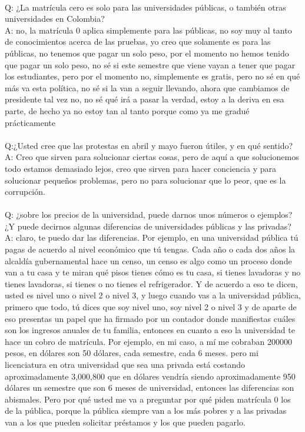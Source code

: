 \documentclass{phyasgn}\usepackage{nag}
\begin{document}
\\
Q: ¿La matrícula cero es solo para las universidades públicas, o también otras universidades en Colombia?\\
A: no, la matrícula 0 aplica simplemente para las públicas, no soy muy al tanto de conocimientos acerca de las pruebas, yo creo que solamente es para las públicas, no tenemos que pagar un solo peso, por el momento no hemos tenido que pagar un solo peso, no sé si este semestre que viene vayan a tener que pagar los estudiantes, pero por el momento no, simplemente es gratis, pero no sé en qué más va esta política, no sé si la van a seguir llevando, ahora que cambiamos de presidente tal vez no, no sé qué irá a pasar la verdad, estoy a la deriva en esa parte, de hecho ya no estoy tan al tanto porque como ya me gradué prácticamente\\
\\
Q:¿Usted cree que las protestas en abril y mayo fueron útiles, y en qué sentido?\\
A: Creo que sirven para solucionar ciertas cosas, pero de aquí a que solucionemos todo estamos demasiado lejos, creo que sirven para hacer conciencia y para solucionar pequeños problemas, pero no para solucionar que lo peor, que es la corrupción.\\
\\
Q: ¿sobre los precios de la universidad, puede darnos unos números o ejemplos? ¿Y puede decirnos algunas diferencias de universidades públicas y las privadas?\\
A: claro, te puedo dar las diferencias. Por ejemplo, en una universidad pública tú pagas de acuerdo al nivel económico que tú tengas. Cada año o cada dos años la alcaldía gubernamental hace un censo, un censo es algo como un proceso donde van a tu casa y te miran qué pisos tienes cómo es tu casa, si tienes lavadoras y no tienes lavadoras, si tienes o no tienes el refrigerador. Y de acuerdo a eso te dicen, usted es nivel uno o nivel 2 o nivel 3, y luego cuando vas a la universidad pública, primero que todo, tú dices que soy nivel uno, soy nivel 2 o nivel 3 y de aparte de eso presentas un papel que ha firmado por un contador donde manifiestas cuáles son los ingresos anuales de tu familia, entonces en cuanto a eso la universidad te hace un cobro de matrícula.
Por ejemplo, en mi caso, a mí me cobraban 200000 pesos, en dólares son 50 dólares, cada semestre, cada 6 meses. pero mi licenciatura en otra universidad que sea una privada está costando aproximadamente 3,000,800 que en dólares vendría siendo aproximadamente 950 dólares un semestre que son 6 meses de universidad, entonces las diferencias son abismales. Pero por qué usted me va a preguntar por qué piden matrícula 0 los de la pública, porque la pública siempre van a los más pobres y a las privadas van a los que pueden solicitar préstamos y los que pueden pagarlo.\\
\end{document}
